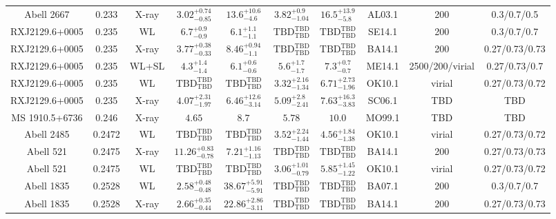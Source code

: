 \begin{table}
\begin{tabular}{cccccccccc}
Abell 2667 & 0.233 & X-ray & ${3.02}^{+0.74}_{-0.85}$ & ${13.6}^{+10.6}_{-4.6}$ & ${3.82}^{+0.9}_{-1.04}$ & ${16.5}^{+13.9}_{-5.8}$ & AL03.1 & 200 & 0.3/0.7/0.5 \\
RXJ2129.6+0005 & 0.235 & WL & ${6.7}^{+0.9}_{-0.9}$ & ${6.1}^{+1.1}_{-1.1}$ & ${\mathrm{TBD}}^{\mathrm{TBD}}_{\mathrm{TBD}}$ & ${\mathrm{TBD}}^{\mathrm{TBD}}_{\mathrm{TBD}}$ & SE14.1 & 200 & 0.3/0.7/0.7 \\
RXJ2129.6+0005 & 0.235 & X-ray & ${3.77}^{+0.38}_{-0.33}$ & ${8.46}^{+0.94}_{-1.1}$ & ${\mathrm{TBD}}^{\mathrm{TBD}}_{\mathrm{TBD}}$ & ${\mathrm{TBD}}^{\mathrm{TBD}}_{\mathrm{TBD}}$ & BA14.1 & 200 & 0.27/0.73/0.73 \\
RXJ2129.6+0005 & 0.235 & WL+SL & ${4.3}^{+1.4}_{-1.4}$ & ${6.1}^{+0.6}_{-0.6}$ & ${5.6}^{+1.7}_{-1.7}$ & ${7.3}^{+0.7}_{-0.7}$ & ME14.1 & 2500/200/virial & 0.27/0.73/0.7 \\
RXJ2129.6+0005 & 0.235 & WL & ${\mathrm{TBD}}^{\mathrm{TBD}}_{\mathrm{TBD}}$ & ${\mathrm{TBD}}^{\mathrm{TBD}}_{\mathrm{TBD}}$ & ${3.32}^{+2.16}_{-1.34}$ & ${6.71}^{+2.73}_{-1.96}$ & OK10.1 & virial & 0.27/0.73/0.72 \\
RXJ2129.6+0005 & 0.235 & X-ray & ${4.07}^{+2.31}_{-1.97}$ & ${6.46}^{+12.6}_{-3.14}$ & ${5.09}^{+2.8}_{-2.41}$ & ${7.63}^{+16.3}_{-3.83}$ & SC06.1 & TBD & TBD \\
MS 1910.5+6736 & 0.246 & X-ray & ${4.65}^{}_{}$ & ${8.7}^{}_{}$ & ${5.78}^{}_{}$ & ${10.0}^{}_{}$ & MO99.1 & TBD & TBD \\
Abell 2485 & 0.2472 & WL & ${\mathrm{TBD}}^{\mathrm{TBD}}_{\mathrm{TBD}}$ & ${\mathrm{TBD}}^{\mathrm{TBD}}_{\mathrm{TBD}}$ & ${3.52}^{+2.24}_{-1.44}$ & ${4.56}^{+1.84}_{-1.38}$ & OK10.1 & virial & 0.27/0.73/0.72 \\
Abell 521 & 0.2475 & X-ray & ${11.26}^{+0.83}_{-0.78}$ & ${7.21}^{+1.16}_{-1.13}$ & ${\mathrm{TBD}}^{\mathrm{TBD}}_{\mathrm{TBD}}$ & ${\mathrm{TBD}}^{\mathrm{TBD}}_{\mathrm{TBD}}$ & BA14.1 & 200 & 0.27/0.73/0.73 \\
Abell 521 & 0.2475 & WL & ${\mathrm{TBD}}^{\mathrm{TBD}}_{\mathrm{TBD}}$ & ${\mathrm{TBD}}^{\mathrm{TBD}}_{\mathrm{TBD}}$ & ${3.06}^{+1.01}_{-0.79}$ & ${5.85}^{+1.45}_{-1.22}$ & OK10.1 & virial & 0.27/0.73/0.72 \\
Abell 1835 & 0.2528 & WL & ${2.58}^{+0.48}_{-0.48}$ & ${38.67}^{+5.91}_{-5.91}$ & ${\mathrm{TBD}}^{\mathrm{TBD}}_{\mathrm{TBD}}$ & ${\mathrm{TBD}}^{\mathrm{TBD}}_{\mathrm{TBD}}$ & BA07.1 & 200 & 0.3/0.7/0.7 \\
Abell 1835 & 0.2528 & X-ray & ${2.66}^{+0.35}_{-0.44}$ & ${22.86}^{+2.86}_{-3.11}$ & ${\mathrm{TBD}}^{\mathrm{TBD}}_{\mathrm{TBD}}$ & ${\mathrm{TBD}}^{\mathrm{TBD}}_{\mathrm{TBD}}$ & BA14.1 & 200 & 0.27/0.73/0.73 \\

\end{tabular}
\end{table}
